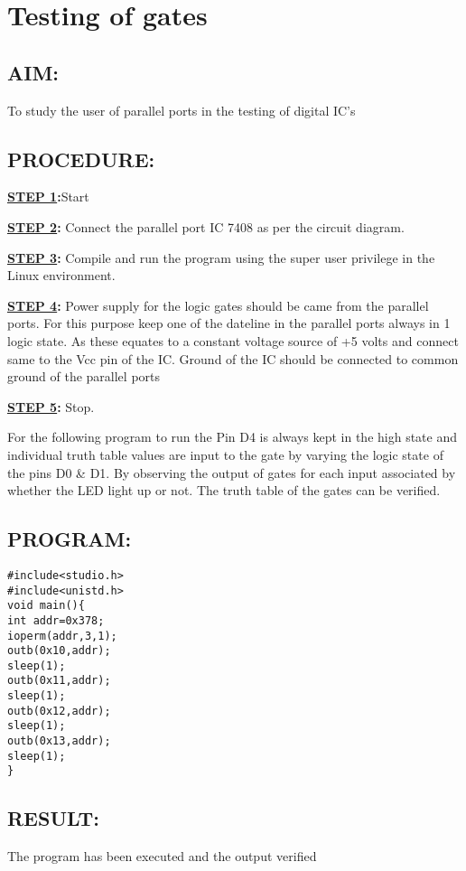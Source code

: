 \chapter{ Testing of gates}
%
%
%
%
\section*{AIM:}
To study the user of parallel ports in the testing of digital IC's

\section*{PROCEDURE:}
\textbf{\underline{STEP 1}:}Start

\textbf{\underline{STEP 2}:} Connect the parallel port IC 7408 as per the circuit diagram.

\textbf{\underline{STEP 3}:}  Compile and run the program using the super user privilege in the Linux environment.

\textbf{\underline{STEP 4}:}  Power supply for the logic gates should be came from the parallel ports. For this purpose keep one of the dateline in the parallel ports always in 1 logic state.
As these equates to a constant voltage source of +5 volts and connect same to the Vcc pin of the IC. Ground of the IC should be connected to common ground of the parallel ports

\textbf{\underline{STEP 5}:} Stop.

For the following program to run the Pin D4 is always kept in the high state and individual truth table values are input to the gate by varying the logic state of the pins D0 & D1. By observing the output of gates for each input associated by whether the LED light up or not. The truth table of the gates can be verified.


\section*{PROGRAM:}

\begin{lstlisting}
#include<studio.h>
#include<unistd.h>
void main(){
int addr=0x378;
ioperm(addr,3,1);
outb(0x10,addr);
sleep(1);
outb(0x11,addr);
sleep(1);
outb(0x12,addr);
sleep(1);
outb(0x13,addr);
sleep(1);
}

\end{lstlisting}



\section*{RESULT:}
The program has been executed and the output verified
%
%
%
%

